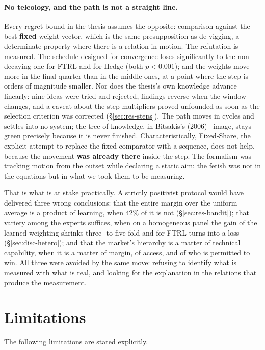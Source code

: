 \documentclass[12pt,a4paper,oneside]{report}
\renewcommand{\_}{\oldunderscore\allowbreak}
\theoremstyle{definition}
\theoremstyle{plain}
\theoremstyle{definition}   %
\begin{document}
\paragraph{No teleology, and the path is not a straight line.} Every regret bound in the thesis
assumes the opposite: comparison against the best \textbf{fixed} weight vector, which is the same
presupposition as de-vigging, a determinate property where there is a relation in motion. The
refutation is measured. The schedule designed for convergence loses significantly to the
non-decaying one for FTRL and for Hedge (both $p<0.001$); and the weights move more in the final quarter than in the middle ones, at a point
where the step is orders of magnitude smaller. Nor does the thesis's own knowledge advance
linearly: nine ideas were tried and rejected, findings reverse when the window changes, and a
caveat about the step multipliers proved unfounded as soon as the selection criterion was
corrected (\S\ref{sec:res-steps}). The path moves in cycles and settles into no system; the tree
of knowledge, in Bitsakis's (2006)~\cite{bitsakis2006} image, stays green precisely because it is never
finished. Characteristically, Fixed-Share,
the explicit attempt to replace the fixed comparator with a sequence, does not help, because the
movement \textbf{was already there} inside the step. The formalism was tracking motion from the
outset while declaring a static aim: the fetish was not in the equations but in what we took them
to be measuring.

That is what is at stake practically. A strictly positivist protocol would have delivered three 
wrong conclusions: that the entire margin over the uniform average is a product of learning, when $42\%$ of it is not
(\S\ref{sec:res-bandit}); that variety among the experts suffices, when on a homogeneous panel
the gain of the learned weighting shrinks three- to five-fold and for FTRL turns into a loss
(\S\ref{sec:disc-hetero}); and that the market's
hierarchy is a matter of technical capability, when it is a matter of margin, of access, and of
who is permitted to win. All three were avoided by the same move: refusing to identify what is
measured with what is real, and looking for the explanation in the relations that produce the
measurement.

\section{Limitations}
\label{sec:limits}

The following limitations are stated explicitly.
\end{document}

